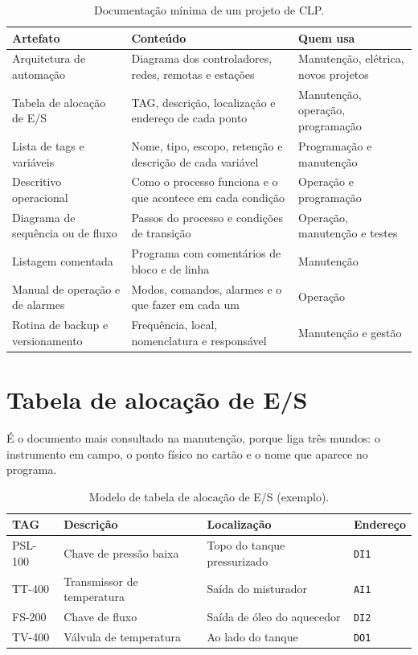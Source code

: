 \begin{table}[H]
  \centering
  \caption{Documentação mínima de um projeto de CLP.}
  \label{tab:artefatos-documentacao}
  \begin{tabular}{p{4.2cm} p{5.6cm} p{4.6cm}}
    \toprule
    Artefato & Conteúdo & Quem usa \\
    \midrule
    Arquitetura de automação
      & Diagrama dos controladores, redes, remotas e estações
      & Manutenção, elétrica, novos projetos \\
    Tabela de alocação de E/S
      & TAG, descrição, localização e endereço de cada ponto
      & Manutenção, operação, programação \\
    Lista de tags e variáveis
      & Nome, tipo, escopo, retenção e descrição de cada variável
      & Programação e manutenção \\
    Descritivo operacional
      & Como o processo funciona e o que acontece em cada condição
      & Operação e programação \\
    Diagrama de sequência ou de fluxo
      & Passos do processo e condições de transição
      & Operação, manutenção e testes \\
    Listagem comentada
      & Programa com comentários de bloco e de linha
      & Manutenção \\
    Manual de operação e de alarmes
      & Modos, comandos, alarmes e o que fazer em cada um
      & Operação \\
    Rotina de backup e versionamento
      & Frequência, local, nomenclatura e responsável
      & Manutenção e gestão \\
    \bottomrule
  \end{tabular}
\end{table}

\section{Tabela de alocação de E/S}

É o documento mais consultado na manutenção, porque liga três mundos: o instrumento em campo, o ponto
físico no cartão e o nome que aparece no programa.

\begin{table}[H]
  \centering
  \caption{Modelo de tabela de alocação de E/S (exemplo).}
  \label{tab:tabela-alocacao}
  \begin{tabular}{l l l l}
    \toprule
    TAG & Descrição & Localização & Endereço \\
    \midrule
    PSL-100 & Chave de pressão baixa & Topo do tanque pressurizado & \texttt{DI1} \\
    TT-400  & Transmissor de temperatura & Saída do misturador & \texttt{AI1} \\
    FS-200  & Chave de fluxo & Saída de óleo do aquecedor & \texttt{DI2} \\
    TV-400  & Válvula de temperatura & Ao lado do tanque & \texttt{DO1} \\
    \bottomrule
  \end{tabular}
\end{table}

